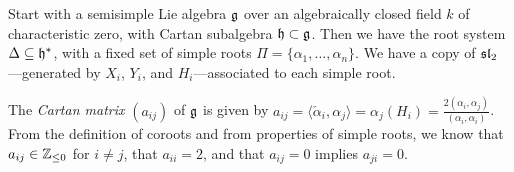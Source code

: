  \setcounter{lecture}{16}
 \newcommand\jj{\mathfrak{j}}

 Start with a semisimple Lie algebra $\g$ over an algebraically closed field $k$ of
 characteristic zero, with Cartan subalgebra $\h\subset \g$. Then we have the root
 system $\Delta\subseteq \h^*$, with a fixed set of simple roots $\Pi =
 \{\alpha_1,\dots, \alpha_n\}$. We have a copy of $\sl_2$---generated by
 $X_i$, $Y_i$, and $H_i$---associated to each simple root.

 The \emph{Cartan matrix} $(a_{ij})$ of $\g$ is given by
 $a_{ij} = \langle \check\alpha_i,\alpha_j\rangle = \alpha_j(H_i) =
 \frac{2(\alpha_i,\alpha_j)}{(\alpha_i,\alpha_i)}$. From the definition of coroots and
 from properties of simple roots, we know that $a_{ij} \in \ZZ_{\le 0}$ for $i\neq j$,
 that $a_{ii}=2$, and that $a_{ij}=0$ implies $a_{ji}=0$.


